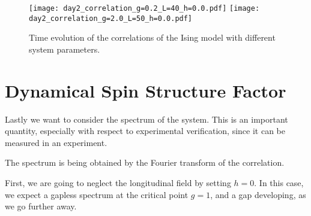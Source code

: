 \begin{figure}[htbp]
    \centering
    \texttt{[image: day2\_correlation\_g=0.2\_L=40\_h=0.0.pdf]}
    \texttt{[image: day2\_correlation\_g=2.0\_L=50\_h=0.0.pdf]}
    \caption{Time evolution of the correlations of the Ising model with different system parameters.}
\end{figure}











\newpage
\section{Dynamical Spin Structure Factor}
Lastly we want to consider the spectrum of the system.
This is an important quantity, especially with respect to experimental verification, since it can be measured in an experiment.

The spectrum is being obtained by the Fourier transform of the correlation.

First, we are going to neglect the longitudinal field by setting $h=0$.
In this case, we expect a gapless spectrum at the critical point $g=1$, and a gap developing, as we go further away.

